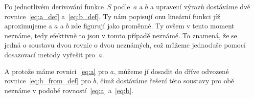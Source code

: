 Po jednotlivém derivování funkce~$S$ podle~$a$ a $b$ a upravení výrazů
dostáváme dvě rovnice~\eqref{eq:a_def} a~\eqref{eq:b_def}. Ty nám popisují onu
lineární funkci jíž aproximujeme a $a$ a $b$ zde figurují jako proměnné. Ty
ovšem v tento moment neznáme, tedy efektivně to jsou v tomto případě neznámé.
To znamená, že se jedná o soustavu dvou rovnic o dvou neznámých, což můžeme
jednoduše pomocí dosazovací metody vyřešit pro~$a$.

A protože máme rovnici~\eqref{eq:a} pro $a$, můžeme jí dosadit do dříve
odvozené rovnice~\eqref{eq:b_from_def} pro $b$, čímž dostáváme řešení této
soustavy pro obě neznáme v podobě rovností~\eqref{eq:a} a~\eqref{eq:b}.
